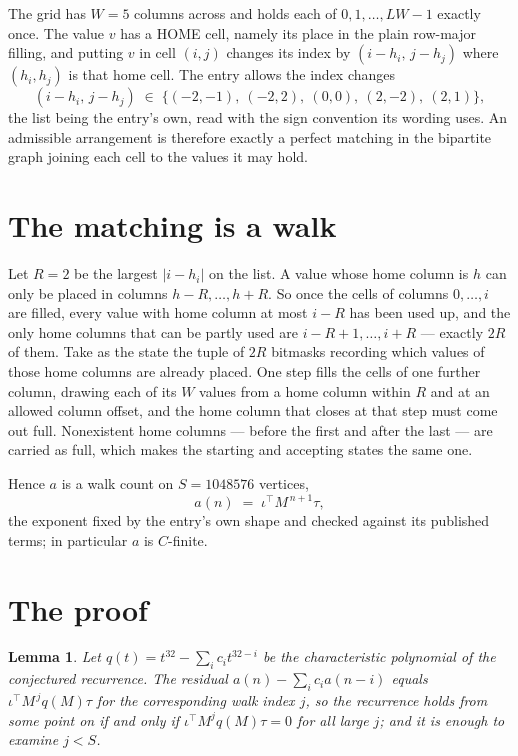 \documentclass[11pt,a4paper]{article}
\theoremstyle{plain}
\newtheorem{lemma}[theorem]{Lemma}
\theoremstyle{definition}
\begin{document}
The grid has $W=5$ columns across and holds each of $0,1,\dots,LW-1$ exactly once. The value
$v$ has a HOME cell, namely its place in the plain row-major filling, and putting $v$ in cell
$(i,j)$ changes its index by $(i-h_i,\,j-h_j)$ where $(h_i,h_j)$ is that home cell. The entry
allows the index changes
\[
(i-h_i,\,j-h_j)\;\in\;\{(-2,-1),\ (-2,2),\ (0,0),\ (2,-2),\ (2,1)\},
\]
the list being the entry's own, read with the sign convention its wording uses. An admissible
arrangement is therefore exactly a perfect matching in the bipartite graph joining each cell to
the values it may hold.

\section{The matching is a walk}

Let $R=2$ be the largest $|i-h_i|$ on the list. A value whose home column is $h$ can only be
placed in columns $h-R,\dots,h+R$. So once the cells of columns $0,\dots,i$ are filled, every
value with home column at most $i-R$ has been used up, and the only home columns that can be
partly used are $i-R+1,\dots,i+R$ --- exactly $2R$ of them. Take as the state the tuple of
$2R$ bitmasks recording which values of those home columns are already placed. One step fills
the cells of one further column, drawing each of its $W$ values from a home column within $R$
and at an allowed column offset, and the home column that closes at that step must come out
full. Nonexistent home columns --- before the first and after the last --- are carried as
full, which makes the starting and accepting states the same one.

Hence $a$ is a walk count on $S=1048576$ vertices,
\[
a(n)\;=\;\iota^{\!\top}M^{\,n+1}\tau ,
\]
the exponent fixed by the entry's own shape and checked against its published terms; in
particular $a$ is $C$-finite.

\section{The proof}

\begin{lemma}\label{lem:crit}
Let $q(t)=t^{32}-\sum_i c_it^{32-i}$ be the characteristic polynomial of the
conjectured recurrence. The residual $a(n)-\sum_ic_ia(n-i)$ equals
$\iota^{\!\top}M^{\,j}q(M)\tau$ for the corresponding walk index $j$, so the recurrence
holds from some point on if and only if $\iota^{\!\top}M^{j}q(M)\tau=0$ for all large $j$;
and it is enough to examine $j<S$.
\end{lemma}
\end{document}
